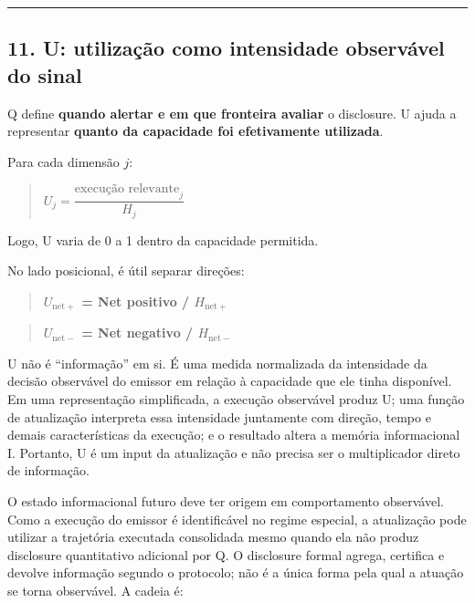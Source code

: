\documentclass[
  a4paper,
]{article}
\begin{document}
\begin{center}\rule{0.5\linewidth}{0.5pt}\end{center}

\hypertarget{11-u-utilizacao-como-intensidade-observavel-do-sinal}{}

\hypertarget{11-u-utilizauxe7uxe3o-como-intensidade-observuxe1vel-do-sinal}{%
\subsection{11. U: utilização como intensidade observável do
sinal}\label{11-u-utilizauxe7uxe3o-como-intensidade-observuxe1vel-do-sinal}}

Q define \textbf{quando alertar e em que fronteira avaliar} o
disclosure. U ajuda a representar \textbf{quanto da capacidade foi
efetivamente utilizada}.

Para cada dimensão \(j\):

\begin{quote}
\textbf{\(U_j = \dfrac{\text{execução relevante}_j}{H_j}\)}
\end{quote}

Logo, U varia de 0 a 1 dentro da capacidade permitida.

No lado posicional, é útil separar direções:

\begin{quote}
\textbf{\(U_{\mathrm{net}+}\) = Net positivo / \(H_{\mathrm{net}+}\)}
\end{quote}

\begin{quote}
\textbf{\(U_{\mathrm{net}-}\) = \textbar Net negativo\textbar{} /
\(H_{\mathrm{net}-}\)}
\end{quote}

U não é ``informação'' em si. É uma medida normalizada da intensidade da
decisão observável do emissor em relação à capacidade que ele tinha
disponível. Em uma representação simplificada, a execução observável
produz U; uma função de atualização interpreta essa intensidade
juntamente com direção, tempo e demais características da execução; e o
resultado altera a memória informacional I. Portanto, U é um input da
atualização e não precisa ser o multiplicador direto de informação.

O estado informacional futuro deve ter origem em comportamento
observável. Como a execução do emissor é identificável no regime
especial, a atualização pode utilizar a trajetória executada consolidada
mesmo quando ela não produz disclosure quantitativo adicional por Q. O
disclosure formal agrega, certifica e devolve informação segundo o
protocolo; não é a única forma pela qual a atuação se torna observável.
A cadeia é:
\end{document}
